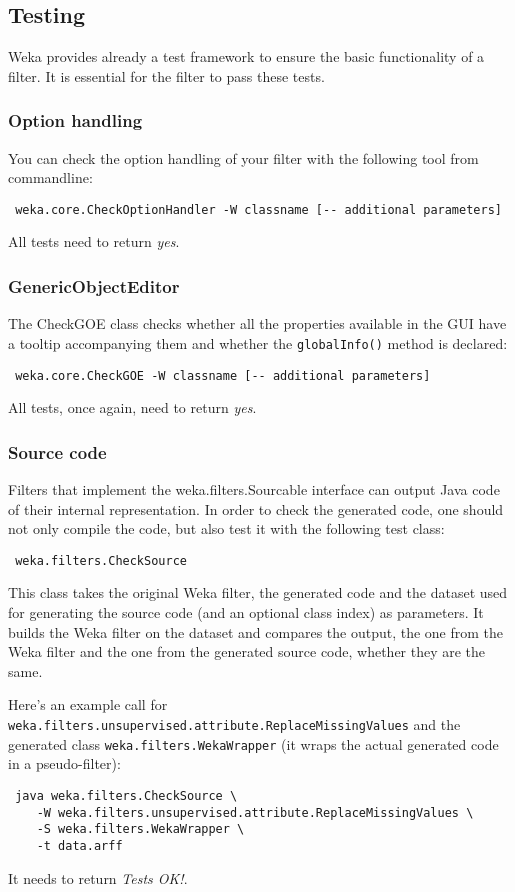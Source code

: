 \newpage
\subsection{Testing}
Weka provides already a test framework to ensure the basic functionality of a
filter. It is essential for the filter to pass these tests.

\subsubsection{Option handling}
You can check the option handling of your filter with the following tool from
commandline:
\begin{verbatim}
 weka.core.CheckOptionHandler -W classname [-- additional parameters]
\end{verbatim}
All tests need to return \textit{yes}.

\subsubsection{GenericObjectEditor}
The CheckGOE class checks whether all the properties available in the GUI have a
tooltip accompanying them and whether the \texttt{globalInfo()} method is
declared:
\begin{verbatim}
 weka.core.CheckGOE -W classname [-- additional parameters]
\end{verbatim}
All tests, once again, need to return \textit{yes}.

\subsubsection{Source code}
Filters that implement the weka.filters.Sourcable interface can output Java code
of their internal representation. In order to check the generated code, one
should not only compile the code, but also test it with the following test
class:
\begin{verbatim}
 weka.filters.CheckSource
\end{verbatim}
This class takes the original Weka filter, the generated code and the dataset
used for generating the source code (and an optional class index) as parameters.
It builds the Weka filter on the dataset and compares the output, the one from
the Weka filter and the one from the generated source code, whether they are the
same.

Here's an example call for
\texttt{weka.filters.unsupervised.attribute.ReplaceMissingValues} and the
generated class \texttt{weka.filters.WekaWrapper} (it wraps the actual generated
code in a pseudo-filter):
\begin{verbatim}
 java weka.filters.CheckSource \
    -W weka.filters.unsupervised.attribute.ReplaceMissingValues \
    -S weka.filters.WekaWrapper \
    -t data.arff
\end{verbatim}
It needs to return \textit{Tests OK!}.

